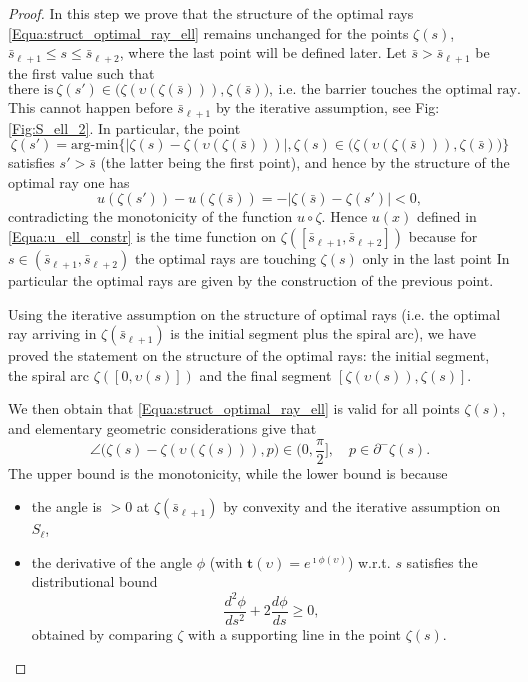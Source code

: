 \documentclass[reqno]{amsart}
\newcounter{assu}
\theoremstyle{definition} \newtheorem{definition}{Definition}[section]
\theoremstyle{definition} \newtheorem{remark}[definition]{Remark}
\theoremstyle{plain} \newtheorem{lemma}[definition]{Lemma}
\theoremstyle{plain} \newtheorem{proposition}[definition]{Proposition}
\theoremstyle{plain} \newtheorem{theorem}[definition]{Theorem}
\theoremstyle{plain} \newtheorem{corollary}[definition]{Corollary}
\theoremstyle{definition} \newtheorem{example}[definition]{Example}
\theoremstyle{plain} \newtheorem{claim}[clai]{Claim}
\theoremstyle{definition} \newtheorem{assumption}[definition]{Assumption}
\theoremstyle{definition} \newtheorem{observation}[definition]{Observation}
\newcommand{\1}{\mathbbm 1}
\renewcommand{\i}{\imath}
\numberwithin{equation}{section} %
\theoremstyle{plain} \newtheorem*{theorem*}{Theorem}
\theoremstyle{plain} \newtheorem{mthm}[maintheorem]{Main Theorem}
\theoremstyle{plain} \newtheorem*{mthm*}{Main Theorem}
\theoremstyle{plain} \newtheorem*{conjecture*}{Conjecture}
\theoremstyle{plain} \newtheorem{conjecture}[definition]{Conjecture}
\theoremstyle{plain} \newtheorem*{problem*}{Problem}
\begin{document}
\begin{proof}
 In this step we prove that the structure of the optimal rays \eqref{Equa:struct_optimal_ray_ell} remains unchanged for the points $\zeta(s)$, $\bar s_{\ell+1} \leq s \leq \bar s_{\ell+2}$, where the last point will be defined later.
Let $\bar s > \bar s_{\ell+1}$ be the first value such that
$$
\text{there is} \ \zeta(s') \in \big( \zeta(\upsilon(\zeta(\bar s))), \zeta(\bar s) \big), \ \text{i.e. the barrier touches the optimal ray}.
$$
This cannot happen before $\bar s_{\ell+1}$ by the iterative assumption, see Fig: \ref{Fig:S_ell_2}. In particular, the point
\begin{equation*}
\zeta(s') = \text{arg-min} \Big\{ \big| \zeta(s) - \zeta(\upsilon(\zeta(\bar s))) \big|, \zeta(s) \in \big( \zeta(\upsilon(\zeta(\bar s))),\zeta(\bar s) \big) \Big\}
\end{equation*}
satisfies $s' > \bar s$ (the latter being the first point), and hence by the structure of the optimal ray one has
\begin{equation*}
u(\zeta(s')) - u(\zeta(\bar s)) = - |\zeta(\bar s) - \zeta(s')| < 0,
\end{equation*}
contradicting the monotonicity of the function $u \circ \zeta$. Hence $u(x)$ defined in \eqref{Equa:u_ell_constr} is the time function on $\zeta([\bar s_{\ell+1},\bar s_{\ell+2}])$ because for $s \in (\bar s_{\ell+1},\bar s_{\ell+2})$ the optimal rays are touching $\zeta(s)$ only in the last point In particular the optimal rays are given by the construction of the previous point.

Using the iterative assumption on the structure of optimal rays (i.e. the optimal ray arriving in $\zeta(\bar s_{\ell+1})$ is the initial segment plus the spiral arc), we have proved the statement on the structure of the optimal rays: the initial segment, the spiral arc $\zeta([0,\upsilon(s)])$ and the final segment $[\zeta(\upsilon(s)),\zeta(s)]$.

\medskip

 We then obtain that \eqref{Equa:struct_optimal_ray_ell} is valid for all points $\zeta(s)$, and elementary geometric considerations give that
\begin{equation}
\label{Equa:angle_ray}
\angle \big( \zeta(s) - \zeta(\upsilon(\zeta(s))), p \big) \in \bigg( 0,\frac{\pi}{2} \bigg], \quad p \in \partial^- \zeta(s).
\end{equation}
The upper bound is the monotonicity, while the lower bound is because
\begin{itemize}
\item the angle is $>0$ at $\zeta(\bar s_{\ell+1})$ by convexity and the iterative assumption on $S_\ell$,
\item the derivative of the angle $\phi$ (with $\mathbf t(\upsilon) = e^{\i \phi(\upsilon)}$) w.r.t. $s$ satisfies the distributional bound
\begin{equation}\label{Equa:convex_phi_lower}
\frac{d^2\phi}{ds^2} + 2 \frac{d\phi}{ds} \geq 0,
\end{equation}
obtained by comparing $\zeta$ with a supporting line in the point $\zeta(s)$.
\end{itemize}


\end{proof}
\end{document}
